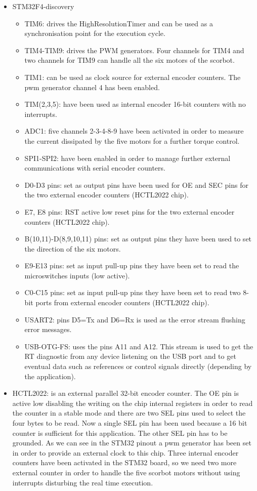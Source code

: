 \begin{itemize}
\item STM32F4-discovery
  \begin{itemize}
  \item TIM6: drives the HighResolutionTimer and can be used as a synchronisation point for the execution cycle.
  \item TIM4-TIM9: drives the PWM generators. Four channels for TIM4 and two channels for TIM9 can handle all the six motors of the scorbot.
  \item TIM1: can be used as clock source for external encoder counters. The pwm generator channel 4 has been enabled.
  \item TIM(2,3,5): have been used as internal encoder 16-bit counters with no interrupts.
  \item ADC1: five channels 2-3-4-8-9 have been activated in order to measure the current dissipated by the five motors for a further torque control.
  \item SPI1-SPI2: have been enabled in order to manage further external communications with serial encoder counters.
  \item D0-D3 pins: set as output pins have been used for OE and SEC pins for the two external encoder counters (HCTL2022 chip).
  \item E7, E8 pins: RST active low reset pins for the two external encoder counters (HCTL2022 chip).
  \item B(10,11)-D(8,9,10,11) pins: set as output pins they have been used to set the direction of the six motors.
  \item E9-E13 pins: set as input pull-up pins they have been set to read the microswitches inputs (low active).
  \item C0-C15 pins: set as input pull-up pins they have been set to read two 8-bit ports from external encoder counters (HCTL2022 chip).
  \item USART2: pins D5=Tx and D6=Rx is used as the error stream flushing error messages.
  \item USB-OTG-FS: uses the pins A11 and A12. This stream is used to get the RT diagnostic from any device listening on the USB port and to get eventual data such as references or control signals directly (depending by the application).
  \end{itemize}
\item HCTL2022: is an external parallel 32-bit encoder counter. The OE pin is active low disabling the writing on the chip internal registers in order to read the counter in a stable mode and there are two SEL pins used to select the four bytes to be read. Now a single SEL pin has been used because a 16 bit counter is sufficient for this application. The other SEL pin has to be grounded. As we can see in the STM32 pinout a pwm generator has been set in order to provide an external clock to this chip. Three internal encoder counters have been activated in the STM32 board, so we need two more external counter in order to handle the five scorbot motors without using interrupts disturbing the real time execution.


\end{itemize}
